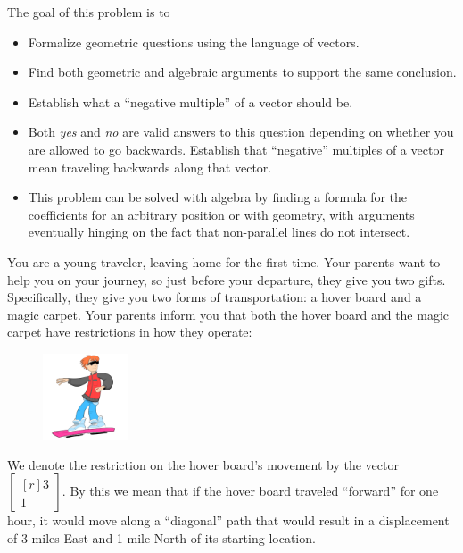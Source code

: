\documentclass{problemset}
\newcommand{\mat}[1]{\begin{bmatrix*}[r]#1\end{bmatrix*}}
\begin{document}
\begin{annotation}
	\begin{goals}
			
		The goal of this problem is to
		\begin{itemize}
			\item Formalize geometric questions using the language of vectors.
			\item Find both geometric and algebraic arguments to support the same 
				conclusion.
			\item Establish what a ``negative multiple'' of a vector should be.
		\end{itemize}
	\end{goals}
	\begin{notes}
		\begin{itemize}
			\item Both \emph{yes} and \emph{no} are valid answers to
				this question depending on whether you are allowed 
				to go backwards. Establish that ``negative'' multiples of
				a vector mean traveling backwards along that vector.
			\item This problem can be solved with algebra by finding a formula
				for the coefficients for an arbitrary position or with geometry,
				with arguments eventually hinging on the fact that non-parallel
				lines do not intersect.
		\end{itemize}
	\end{notes}
\end{annotation}
You are a young traveler, leaving home for the first time. Your parents
want to help you on your journey, so just before your departure, they give
you two gifts. Specifically, they give you two forms of transportation:
a hover board and a magic carpet. Your parents inform you that both the
hover board and the magic carpet have restrictions in how they operate:



\begin{minipage}{\textwidth}
	\vspace{.5cm}
	\begin{figure}
	\vspace{-.8cm}
	\includegraphics[width=1in]{images/HoverBoard-small.png}
	\end{figure}

	We denote the restriction on the hover board's movement by the vector
	$\mat{3 \\1}$. By this we mean that if
	the hover board traveled ``forward'' for one hour, it would move along a
	``diagonal'' path that would result in a displacement of 3 miles East and
	1 mile North of its starting location.
\end{minipage}
\end{document}
